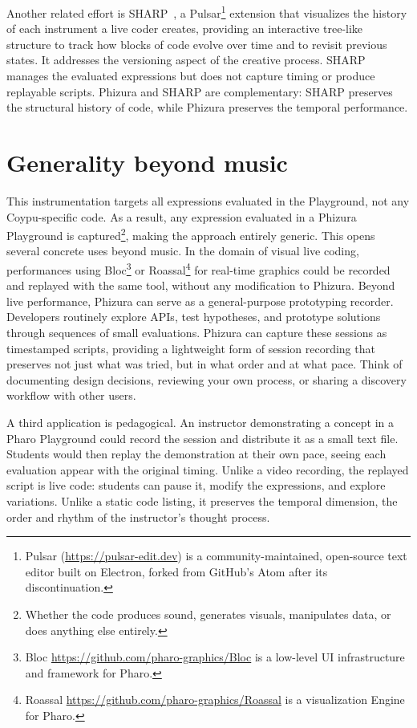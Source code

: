 \documentclass[
]{ceurart}
\begin{document}
Another related effort is SHARP~\cite{Bowm23a}, a Pulsar\footnote{Pulsar (\url{https://pulsar-edit.dev}) is a community-maintained, open-source text editor built on Electron, forked from GitHub's Atom after its discontinuation.} extension that visualizes the history of each instrument a live coder creates, providing an interactive tree-like structure to track how blocks of code evolve over time and to revisit previous states. It addresses the versioning aspect of the creative process. SHARP manages the evaluated expressions but does not capture timing or produce replayable scripts. Phizura and SHARP are complementary: SHARP preserves the structural history of code, while Phizura preserves the temporal performance.

\section{Generality beyond music}
This instrumentation targets all expressions evaluated in the Playground, not any Coypu-specific code. As a result, any expression evaluated in a Phizura Playground is captured\footnote{Whether the code produces sound, generates visuals, manipulates data, or does anything else entirely.}, making the approach entirely generic.
This opens several concrete uses beyond music. In the domain of visual live coding, performances using Bloc\footnote{Bloc \url{https://github.com/pharo-graphics/Bloc} is a low-level UI infrastructure and framework for Pharo.} or Roassal\footnote{Roassal \url{https://github.com/pharo-graphics/Roassal} is a visualization Engine for Pharo.} for real-time graphics could be recorded and replayed with the same tool, without any modification to Phizura.
Beyond live performance, Phizura can serve as a general-purpose prototyping recorder. Developers routinely explore APIs, test hypotheses, and prototype solutions through sequences of small evaluations. Phizura can capture these sessions as timestamped scripts, providing a lightweight form of session recording that preserves not just what was tried, but in what order and at what pace. Think of documenting design decisions, reviewing your own process, or sharing a discovery workflow with other users.

A third application is pedagogical. An instructor demonstrating a concept in a Pharo Playground could record the session and distribute it as a small text file. Students would then replay the demonstration at their own pace, seeing each evaluation appear with the original timing. Unlike a video recording, the replayed script is live code: students can pause it, modify the expressions, and explore variations. Unlike a static code listing, it preserves the temporal dimension, the order and rhythm of the instructor's thought process.%
\end{document}
